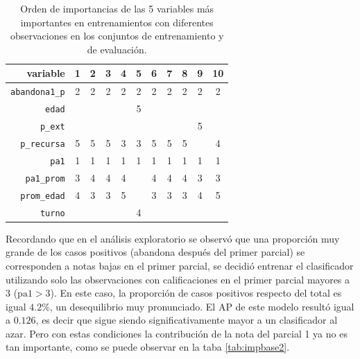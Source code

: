 \documentclass[a4paper,11pt,dvipsnames]{article}
\begin{document}
\begin{table}[!ht]
    \caption{Orden de importancias de las 5 variables más importantes en entrenamientos con diferentes observaciones en los conjuntos de entrenamiento y de evaluación.}
    \begin{center}
    \begin{tabular}{rcccccccccc}
    \hline
    \textbf{variable} & \textbf{1} & \textbf{2} & \textbf{3} & \textbf{4} & \textbf{5}& \textbf{6}& \textbf{7}& \textbf{8}& \textbf{9}& \textbf{10}\\
    \hline
    \texttt{abandona1\_p} & 2 & 2 & 2 & 2 & 2 & 2 & 2 & 2 & 2 & 2\\
    \texttt{edad} & & & & & 5 & &  & & & \\
    \texttt{p\_ext} & & & & & & &  & & 5 & \\
    \texttt{p\_recursa} & 5 & 5 & 5 & 3 & 3 & 5 & 5 & 5 &  & 4 \\
    \texttt{pa1} & 1 & 1 & 1 & 1 & 1 & 1 & 1 & 1 & 1 & 1 \\
    \texttt{pa1\_prom} & 3 & 4 & 4 & 4 & & 4 & 4 & 4 & 3 & 3 \\
    \texttt{prom\_edad} & 4 & 3 & 3 & 5 & & 3 & 3 & 3 & 4 & 5 \\
    \texttt{turno} & & & & & 4 & &  & & & \\
    \hline
    \end{tabular}
    \label{tab:repeticiones}
    \end{center}
\end{table}

Recordando que en el análisis exploratorio se observó que una proporción muy grande de los casos positivos (abandona después del primer parcial) se corresponden a notas bajas en el primer parcial, se decidió entrenar el clasificador utilizando solo las observaciones con calificaciones en el primer parcial mayores a 3 ($\text{pa1} > 3$). En este caso, la proporción de casos positivos respecto del total es igual $4.2\%$, un desequilibrio muy pronunciado. El AP de este modelo resultó igual a $0.126$, es decir que sigue siendo significativamente mayor a un clasificador al azar. Pero con estas condiciones la contribución de la nota del parcial 1 ya no es tan importante, como se puede observar en la taba \ref{tab:impbase2}. \par\medskip 
\end{document}
